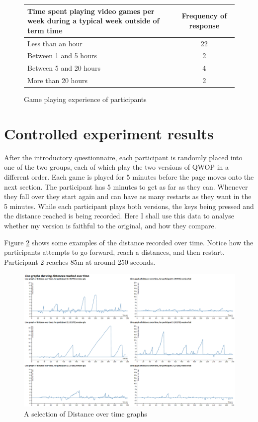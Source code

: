 \documentclass[12pt,a4paper,twoside,openright]{report}
\begin{document}
\begin{figure}[tbh]
\begin{center}
\begin{tabular}{ |p{8cm}|c| }
  \hline
Time spent playing video games per week during a typical week outside of term time & Frequency of response \\ \hline \hline
Less than an hour      & 22 \\ \hline
Between 1 and 5 hours  & 2  \\ \hline
Between 5 and 20 hours & 4  \\ \hline
More than 20 hours     & 2  \\ \hline
\end{tabular}
\end{center}
\caption{Game playing experience of participants}
\label{gamesExperienceTable}
\end{figure}

\section{Controlled experiment results}
\label{controlled experiment results}
After the introductory questionnaire, each participant is randomly placed into one of the two groups, each of which play the two versions of QWOP in a different order. Each game is played for 5 minutes before the page moves onto the next section. 
The participant has 5 minutes to get as far as they can. Whenever they fall over they start again and can have as many restarts as they want in the 5 minutes.
While each participant plays both versions, the keys being pressed and the distance reached is being recorded. Here I shall use this data to analyse whether my version is faithful to the original, and how they compare.

Figure \ref{assorted} shows some examples of the distance recorded over time. Notice how the participants attempts to go forward, reach a distances, and then restart. Participant 2 reaches 85m at around 250 seconds.
\begin{figure}[tbh]
\centerline{\includegraphics[scale=0.39]{assortedLineGraphs.PNG}}
\caption{A selection of Distance over time graphs}
\label{assorted}
\end{figure}
\end{document}

